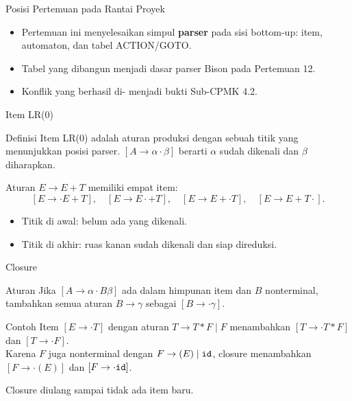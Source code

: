 \documentclass[aspectratio=169,10pt,t]{beamer}
\begin{document}
\begin{frame}{Posisi Pertemuan pada Rantai Proyek}

  \vspace{2pt}
  \begin{itemize}
    \item Pertemuan ini menyelesaikan simpul \textbf{parser} pada sisi
          bottom-up: item, automaton, dan tabel ACTION/GOTO.
    \item Tabel yang dibangun menjadi dasar parser Bison pada
          Pertemuan 12.
    \item Konflik yang berhasil di- menjadi bukti Sub-CPMK
          4.2.
  \end{itemize}
\end{frame}

\begin{frame}{Item LR(0)}
  \begin{block}{Definisi}
    \small
    Item LR(0) adalah aturan produksi dengan sebuah titik yang
    menunjukkan posisi parser. \([A \to \alpha \cdot \beta]\) berarti
    \(\alpha\) sudah dikenali dan \(\beta\) diharapkan.
  \end{block}

  \small
  Aturan \(E \to E+T\) memiliki empat item:
  \[
    [E \to \cdot E+T],\quad
    [E \to E \cdot +T],\quad
    [E \to E+ \cdot T],\quad
    [E \to E+T \cdot].
  \]

  \begin{itemize}
    \item Titik di awal: belum ada yang dikenali.
    \item Titik di akhir: ruas kanan sudah dikenali dan siap
          direduksi.
  \end{itemize}
\end{frame}

\begin{frame}{Closure}
  \begin{block}{Aturan}
    \small
    Jika \([A \to \alpha \cdot B\beta]\) ada dalam himpunan item dan
    \(B\) nonterminal, tambahkan semua aturan \(B \to \gamma\) sebagai
    \([B \to \cdot \gamma]\).
  \end{block}

  \begin{exampleblock}{Contoh}
    \footnotesize
    Item \([E \to \cdot T]\) dengan aturan
    \(T \to T*F \mid F\) menambahkan
    \([T \to \cdot T*F]\) dan \([T \to \cdot F]\).\\
    Karena \(F\) juga nonterminal dengan
    \(F \to (E) \mid \texttt{id}\), closure menambahkan
    \([F \to \cdot (E)]\) dan \([F \to \cdot \texttt{id}]\).
  \end{exampleblock}

  \vspace{2pt}
  {\footnotesize Closure diulang sampai tidak ada item baru.}
\end{frame}
\end{document}
